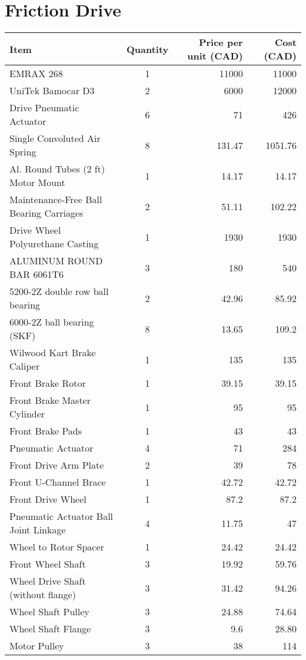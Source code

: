 \documentclass[main.tex]{subfiles}
\begin{document}
\section{Friction Drive}
\begin{table}[H]
	\centering
        \begin{tabular}{@{}lcrr@{}} \toprule
            Item & Quantity & Price per unit (CAD) & Cost (CAD)\\ \midrule
            EMRAX 268 & 1 & 11000 & 11000 \\
	UniTek Bamocar D3 & 2 & 6000 & 12000 \\
	Drive Pneumatic Actuator & 6 & 71 & 426 \\
	Single Convoluted Air Spring & 8 & 131.47 & 1051.76 \\
	Al. Round Tubes (2 ft) Motor Mount & 1 & 14.17 & 14.17 \\
	Maintenance-Free Ball Bearing Carriages & 2 & 51.11 & 102.22 \\
	Drive Wheel Polyurethane Casting & 1 & 1930 & 1930 \\
	ALUMINUM ROUND BAR 6061T6 & 3 & 180 & 540 \\
	5200-2Z double row ball bearing & 2 & 42.96 & 85.92 \\
	6000-2Z ball bearing (SKF) & 8 & 13.65 & 109.2 \\
	Wilwood Kart Brake Caliper & 1 & 135 & 135 \\
	Front Brake Rotor & 1 & 39.15 & 39.15 \\
	Front Brake Master Cylinder & 1 & 95 & 95 \\
	Front Brake Pads & 1 & 43 & 43 \\
	Pneumatic Actuator & 4 & 71 & 284 \\
	Front Drive Arm Plate & 2 & 39 & 78 \\
	Front U-Channel Brace & 1 & 42.72 & 42.72 \\
	Front Drive Wheel & 1 & 87.2 & 87.2 \\
	Pneumatic Actuator Ball Joint Linkage & 4 & 11.75 & 47 \\
	Wheel to Rotor Spacer & 1 & 24.42 & 24.42 \\
	Front Wheel Shaft & 3 & 19.92 & 59.76 \\
	Wheel Drive Shaft (without flange) & 3 & 31.42 & 94.26 \\
	Wheel Shaft Pulley & 3 & 24.88 & 74.64 \\
	Wheel Shaft Flange & 3 & 9.6 & 28.80 \\
	Motor Pulley & 3 & 38 & 114 \\

\end{tabular}
\end{table}
\end{document}
